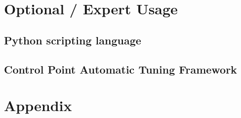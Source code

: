 \documentclass[10pt]{report}
\begin{document}
      
      
%  


\part{Optional / Expert Usage}

\chapter{Python scripting language}
\label{python}
  

\chapter{Control Point Automatic Tuning Framework}
\label{sec:controlpoint}
  

%

\part{Appendix}
\appendix


%






\end{document}
